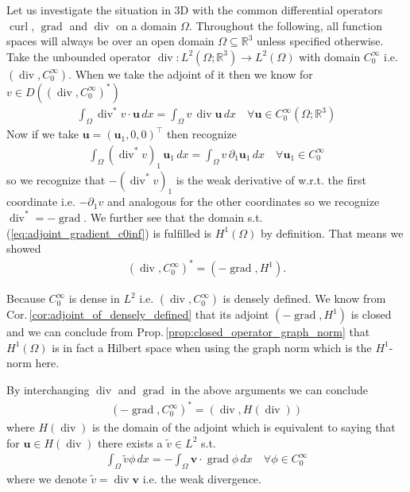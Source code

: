 \documentclass[12pt,a4paper]{article}
\numberwithin{equation}{subsection}
\numberwithin{lemma}{subsection}
\theoremstyle{definition}
\DeclareMathOperator{\curl}{curl}
\DeclareMathOperator{\diver}{div}
\DeclareMathOperator{\grad}{grad}
\newcommand{\real}{\mathbb{R}}
\begin{document}
Let us investigate the situation in 3D with the common differential 
operators $\curl$, $\grad$ and $\diver$ on a domain $\Omega$. Throughout the 
following, all function spaces will always be over an open domain 
$\Omega \subseteq \real^3$ unless specified otherwise.
Take the unbounded operator 
$\diver: L^2(\Omega;\real^3) \rightarrow L^2(\Omega)$ with domain 
$C_0^\infty$ i.e. $(\diver, C_0^\infty)$. 
When we take the adjoint of it then we know for $v \in 
D((\diver, C_0^\infty)^*)$
\begin{align*}
    \int_\Omega \diver ^* v \cdot \mathbf{u} \, dx
    = \int_\Omega v \, \diver \mathbf{u} \, dx \quad \forall 
    \mathbf{u} \in C_0^\infty(\Omega;\real^3)
\end{align*}
Now if we take $\mathbf{u} = (\mathbf{u}_1,0,0)^\top$ then recognize 
\begin{align}
    \int_\Omega (\diver ^* v)_1 \, \mathbf{u}_1 \, dx
    = \int_\Omega v \, \partial_1 \mathbf{u}_1 \, dx \quad 
        \forall \mathbf{u}_1 \in C_0^\infty
    \label{eq:adjoint_gradient_c0inf}
\end{align}
so we recognize that $-(\diver ^* v)_1$ is the weak derivative of w.r.t. the 
first coordinate i.e. $-\partial_1 v$ and analogous for the other coordinates 
so we recognize $\diver^* = -\grad$. We further see that the
domain s.t. (\ref{eq:adjoint_gradient_c0inf}) is fulfilled is $H^1(\Omega)$ 
by definition. That means we showed 
\begin{align*}
    (\diver, C_0^\infty)^* = (-\grad, H^1).     
\end{align*}

Because $C_0^\infty$ is dense in $L^2$ i.e. 
$(\diver, C_0^\infty)$ is densely defined. 
We know from Cor.\,\ref{cor:adjoint_of_densely_defined} 
that its adjoint $(-\grad, H^1)$ is closed and 
we can conclude from Prop.\,\ref{prop:closed_operator_graph_norm} 
that $H^1(\Omega)$ is in fact a Hilbert space 
when using the graph norm which is the $H^1$-norm here.

By interchanging $\diver$ and $\grad$ in the above arguments we can conclude 
\begin{align*}
    (-\grad, C_0^\infty)^* = (\diver, H(\diver))
\end{align*}
where $H(\diver)$ is the domain of the adjoint which is equivalent to saying
that for $\mathbf{u} \in H(\diver)$ there exists a $\tilde{v} \in L^2$ s.t.
\begin{align*}
    \int_\Omega \tilde{v} \phi \, dx = -\int_\Omega \mathbf{v} 
        \cdot \grad \phi \, dx \quad \forall \phi \in C_0^\infty
\end{align*}
where we denote $\tilde{v} = \diver \mathbf{v}$ i.e. the weak divergence.
\end{document}
